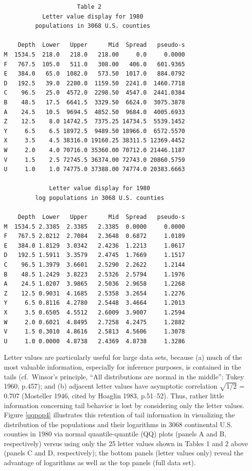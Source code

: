\documentclass[11pt]{article}
\begin{document}
\begin{verbatim}
                     Table 2
           Letter value display for 1980
         populations in 3068 U.S. counties

    Depth  Lower   Upper      Mid  Spread   pseudo-s
M  1534.5  218.0   218.0   218.00     0.0     0.0000
F   767.5  105.0   511.0   308.00   406.0   601.9365
E   384.0   65.0  1082.0   573.50  1017.0   884.0792
D   192.5   39.0  2280.0  1159.50  2241.0  1460.7718
C    96.5   25.0  4572.0  2298.50  4547.0  2441.0384
B    48.5   17.5  6641.5  3329.50  6624.0  3075.3878
A    24.5   10.5  9694.5  4852.50  9684.0  4005.6933
Z    12.5    8.0 14742.5  7375.25 14734.5  5539.1452
Y     6.5    6.5 18972.5  9489.50 18966.0  6572.5570
X     3.5    4.5 38316.0 19160.25 38311.5 12369.4452
W     2.0    4.0 70716.0 35360.00 70712.0 21446.1187
V     1.5    2.5 72745.5 36374.00 72743.0 20860.5759
U     1.0    1.0 74775.0 37388.00 74774.0 20383.6663

             Letter value display for 1980
         log populations in 3068 U.S. counties

    Depth  Lower   Upper      Mid  Spread   pseudo-s
M  1534.5 2.3385  2.3385   2.3385  0.0000     0.0000
F   767.5 2.0212  2.7084   2.3648  0.6872     1.0189
E   384.0 1.8129  3.0342   2.4236  1.2213     1.0617
D   192.5 1.5911  3.3579   2.4745  1.7669     1.1517
C    96.5 1.3979  3.6601   2.5290  2.2622     1.2144
B    48.5 1.2429  3.8223   2.5326  2.5794     1.1976
A    24.5 1.0207  3.9865   2.5036  2.9658     1.2268
Z    12.5 0.9031  4.1685   2.5358  3.2654     1.2276
Y     6.5 0.8116  4.2780   2.5448  3.4664     1.2013
X     3.5 0.6505  4.5512   2.6009  3.9007     1.2594
W     2.0 0.6021  4.8495   2.7258  4.2475     1.2882
V     1.5 0.3010  4.8616   2.5813  4.5606     1.3078
U     1.0 0.0000  4.8738   2.4369  4.8738     1.3286
\end{verbatim}

Letter values are particularly useful for large data sets,
because (a) much of the most valuable information, especially
for inference purposes, is contained in the tails
(cf.~Winsor's principle, ``All distributions are normal
in the middle''; Tukey 1960, p.457); and (b) adjacent
letter values have asymptotic correlation $\sqrt{1/2}$ = 0.707
(Mosteller 1946, cited by Hoaglin 1983, p.51--52).
Thus, rather little information concerning tail behavior
is lost by considering only the letter values.  Figure \ref{qqpop4}
illustrates this retention of tail information in visualizing the
distribution of the populations and their logarithms
in 3068 continental U.S. counties in 1980 via
normal quantile-quantile (QQ) plots (panels A and B, respectively)
versus using only the 25 letter values shown in Tables 1 and 2 above
(panels C and D, respectively); the bottom panels (letter values only)
reveal the advantage of logarithms as well as the top panels (full data set).
\end{document}
